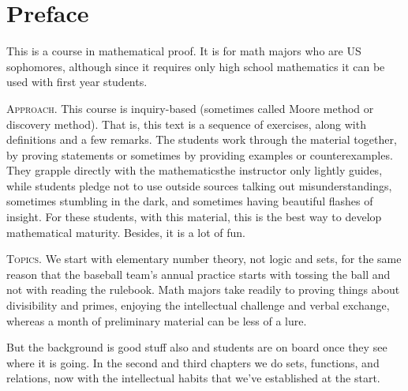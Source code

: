 \chapter*{Preface}

This is a course in mathematical proof. 
It is for math majors who are US sophomores, although since
it requires only high school mathematics
it can be used with first year students.



\medskip
\noindent\textsc{Approach.}
This course is inquiry-based (sometimes called Moore method 
or discovery method).
That is, this text is a sequence of exercises,
along with definitions and a few 
remarks.
The students work through the material together, by
proving statements or sometimes by providing examples or counterexamples.
They grapple directly with the mathematics\Dash the instructor only 
lightly guides, while students pledge not to use outside sources\Dash
talking out misunderstandings, 
sometimes stumbling in the dark, and sometimes
having beautiful flashes of insight.
For these students, with this material,
this is the best way to develop mathematical maturity.
Besides, it is a lot of fun.


\medskip
\noindent\textsc{Topics.}
We start with elementary number theory, not logic and sets, 
for the same reason
that the baseball team's annual practice starts with tossing the ball and 
not with reading the rulebook.
Math majors take readily to proving things about
divisibility and primes, enjoying the 
intellectual challenge and verbal exchange, 
whereas a month of preliminary material can be less of a lure.

But the background is good stuff also and 
students are on board once they see where it is going.
In the second and third chapters we do
sets, functions, and relations, now with the
intellectual habits that we've established at the start.




